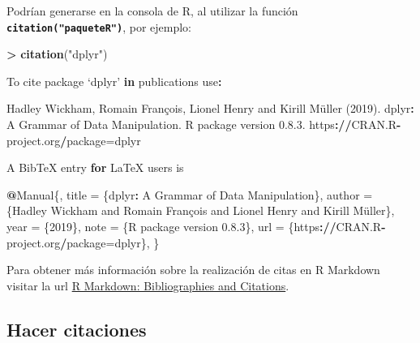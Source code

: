 \documentclass[12pt,a4paper,]{book}
\newenvironment{Shaded}{\begin{snugshade}}{\end{snugshade}}
\newcommand{\ControlFlowTok}[1]{\textcolor[rgb]{0.13,0.29,0.53}{\textbf{#1}}}
\newcommand{\DecValTok}[1]{\textcolor[rgb]{0.00,0.00,0.81}{#1}}
\newcommand{\ErrorTok}[1]{\textcolor[rgb]{0.64,0.00,0.00}{\textbf{#1}}}
\newcommand{\FloatTok}[1]{\textcolor[rgb]{0.00,0.00,0.81}{#1}}
\newcommand{\FunctionTok}[1]{\textcolor[rgb]{0.13,0.29,0.53}{\textbf{#1}}}
\newcommand{\NormalTok}[1]{#1}
\newcommand{\OtherTok}[1]{\textcolor[rgb]{0.56,0.35,0.01}{#1}}
\newcommand{\SpecialCharTok}[1]{\textcolor[rgb]{0.81,0.36,0.00}{\textbf{#1}}}
\newcommand{\StringTok}[1]{\textcolor[rgb]{0.31,0.60,0.02}{#1}}
\numberwithin{dummy}{section}
\theoremstyle{ocrenumbox}
\theoremstyle{blacknumex}
\theoremstyle{blacknumbox}
\theoremstyle{ocrenum}
\theoremstyle{ocrenum}
\begin{document}
Podrían generarse en la consola de R, al utilizar la función
\textbf{\texttt{citation("paqueteR")}}, por ejemplo:

\footnotesize

\begin{Shaded}
\begin{Highlighting}[]
\SpecialCharTok{\textgreater{}} \FunctionTok{citation}\NormalTok{(}\StringTok{"dplyr"}\NormalTok{)}

\NormalTok{To cite package ‘dplyr’ }\ControlFlowTok{in}\NormalTok{ publications use}\SpecialCharTok{:}

\NormalTok{  Hadley Wickham, Romain François, Lionel Henry and Kirill Müller (}\DecValTok{2019}\NormalTok{). dplyr}\SpecialCharTok{:}\NormalTok{ A}
\NormalTok{  Grammar of Data Manipulation. R package version }\DecValTok{0}\NormalTok{.}\DecValTok{8}\NormalTok{.}\FloatTok{3.}
\NormalTok{  https}\SpecialCharTok{:}\ErrorTok{//}\NormalTok{CRAN.R}\SpecialCharTok{{-}}\NormalTok{project.org}\SpecialCharTok{/}\NormalTok{package}\OtherTok{=}\NormalTok{dplyr}

\NormalTok{A BibTeX entry }\ControlFlowTok{for}\NormalTok{ LaTeX users is}

  \SpecialCharTok{@}\NormalTok{Manual\{,}
\NormalTok{    title }\OtherTok{=}\NormalTok{ \{dplyr}\SpecialCharTok{:}\NormalTok{ A Grammar of Data Manipulation\},}
\NormalTok{    author }\OtherTok{=}\NormalTok{ \{Hadley Wickham and Romain François and Lionel Henry and Kirill Müller\},}
\NormalTok{    year }\OtherTok{=}\NormalTok{ \{}\DecValTok{2019}\NormalTok{\},}
\NormalTok{    note }\OtherTok{=}\NormalTok{ \{R package version }\DecValTok{0}\NormalTok{.}\FloatTok{8.3}\NormalTok{\},}
\NormalTok{    url }\OtherTok{=}\NormalTok{ \{https}\SpecialCharTok{:}\ErrorTok{//}\NormalTok{CRAN.R}\SpecialCharTok{{-}}\NormalTok{project.org}\SpecialCharTok{/}\NormalTok{package}\OtherTok{=}\NormalTok{dplyr\},}
\NormalTok{  \}}
\end{Highlighting}
\end{Shaded}

\normalsize

Para obtener más información sobre la realización de citas en R Markdown
visitar la url
\href{https://rmarkdown.rstudio.com/authoring_bibliographies_and_citations.html}{R
Markdown: Bibliographies and Citations}.

\hypertarget{hacer-citaciones}{%
\subsection{Hacer citaciones}\label{hacer-citaciones}}
\end{document}
